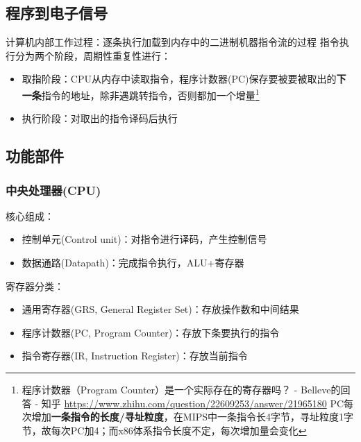 \subsection{程序到电子信号}
\begin{center}
\end{center}
计算机内部工作过程：逐条执行加载到内存中的二进制机器指令流的过程
指令执行分为两个阶段，周期性重复性进行：
\begin{itemize}
	\item 取指阶段：CPU从内存中读取指令，程序计数器(PC)保存要被要被取出的\textbf{下一条}指令的地址，除非遇跳转指令，否则都加一个增量\footnote{程序计数器（Program Counter）是一个实际存在的寄存器吗？ - Belleve的回答 - 知乎 \url{https://www.zhihu.com/question/22609253/answer/21965180} PC每次增加\textbf{一条指令的长度/寻址粒度}，在MIPS中一条指令长4字节，寻址粒度1字节，故每次PC加4；而x86体系指令长度不定，每次增加量会变化}
	\item 执行阶段：对取出的指令译码后执行
\end{itemize}

\subsection{功能部件}
\subsubsection{中央处理器(CPU)}
核心组成：
\begin{itemize}
	\item 控制单元(Control unit)：对指令进行译码，产生控制信号
	\item 数据通路(Datapath)：完成指令执行，ALU+寄存器
\end{itemize}
寄存器分类：
\begin{itemize}
	\item 通用寄存器(GRS, General Register Set)：存放操作数和中间结果
	\item 程序计数器(PC, Program Counter)：存放下条要执行的指令
	\item 指令寄存器(IR, Instruction Register)：存放当前指令
\end{itemize}


